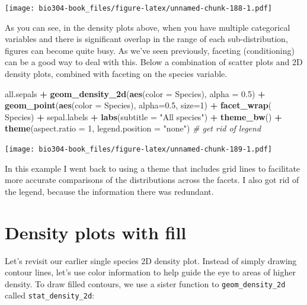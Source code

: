 \documentclass[]{book}
\newenvironment{Shaded}{\begin{snugshade}}{\end{snugshade}}
\newcommand{\CommentTok}[1]{\textcolor[rgb]{0.56,0.35,0.01}{\textit{#1}}}
\newcommand{\DataTypeTok}[1]{\textcolor[rgb]{0.13,0.29,0.53}{#1}}
\newcommand{\DecValTok}[1]{\textcolor[rgb]{0.00,0.00,0.81}{#1}}
\newcommand{\FloatTok}[1]{\textcolor[rgb]{0.00,0.00,0.81}{#1}}
\newcommand{\KeywordTok}[1]{\textcolor[rgb]{0.13,0.29,0.53}{\textbf{#1}}}
\newcommand{\NormalTok}[1]{#1}
\newcommand{\OperatorTok}[1]{\textcolor[rgb]{0.81,0.36,0.00}{\textbf{#1}}}
\newcommand{\StringTok}[1]{\textcolor[rgb]{0.31,0.60,0.02}{#1}}
\theoremstyle{definition}
\theoremstyle{definition}
\theoremstyle{definition}
\theoremstyle{remark}
\begin{document}
\texttt{[image: bio304-book\_files/figure-latex/unnamed-chunk-188-1.pdf]}

As you can see, in the density plots above, when you have multiple
categorical variables and there is significant overlap in the range of
each sub-distribution, figures can become quite busy. As we've seen
previously, faceting (conditioning) can be a good way to deal with this.
Below a combination of scatter plots and 2D density plots, combined with
faceting on the species variable.

\begin{Shaded}
\begin{Highlighting}[]
\NormalTok{all.sepals }\OperatorTok{+}\StringTok{ }
\StringTok{  }\KeywordTok{geom_density_2d}\NormalTok{(}\KeywordTok{aes}\NormalTok{(}\DataTypeTok{color =}\NormalTok{ Species), }\DataTypeTok{alpha =} \FloatTok{0.5}\NormalTok{) }\OperatorTok{+}\StringTok{ }
\StringTok{  }\KeywordTok{geom_point}\NormalTok{(}\KeywordTok{aes}\NormalTok{(}\DataTypeTok{color =}\NormalTok{ Species), }\DataTypeTok{alpha=}\FloatTok{0.5}\NormalTok{, }\DataTypeTok{size=}\DecValTok{1}\NormalTok{) }\OperatorTok{+}\StringTok{ }
\StringTok{  }\KeywordTok{facet_wrap}\NormalTok{(}\OperatorTok{~}\StringTok{ }\NormalTok{Species) }\OperatorTok{+}
\StringTok{  }\NormalTok{sepal.labels }\OperatorTok{+}\StringTok{ }\KeywordTok{labs}\NormalTok{(}\DataTypeTok{subtitle =} \StringTok{"All species"}\NormalTok{) }\OperatorTok{+}
\StringTok{  }\KeywordTok{theme_bw}\NormalTok{() }\OperatorTok{+}\StringTok{ }
\StringTok{  }\KeywordTok{theme}\NormalTok{(}\DataTypeTok{aspect.ratio =} \DecValTok{1}\NormalTok{, }\DataTypeTok{legend.position =} \StringTok{"none"}\NormalTok{)  }\CommentTok{# get rid of legend}
\end{Highlighting}
\end{Shaded}

\texttt{[image: bio304-book\_files/figure-latex/unnamed-chunk-189-1.pdf]}

In this example I went back to using a theme that includes grid lines to
facilitate more accurate comparisons of the distributions across the
facets. I also got rid of the legend, because the information there was
redundant.

\hypertarget{density-plots-with-fill}{%
\section{Density plots with fill}\label{density-plots-with-fill}}

Let's revisit our earlier single species 2D density plot. Instead of
simply drawing contour lines, let's use color information to help guide
the eye to areas of higher density. To draw filled contours, we use a
sister function to \texttt{geom\_density\_2d} called
\texttt{stat\_density\_2d}:
\end{document}
